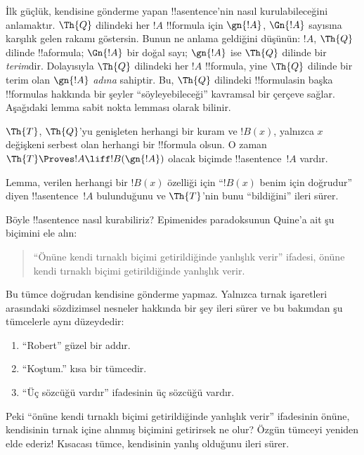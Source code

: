 İlk güçlük, kendisine gönderme yapan !!a{sentence}'nin nasıl kurulabileceğini
anlamaktır. $\Th{Q}$ dilindeki her $!A$ !!{formula} için $\gn{!A}$,
$\Gn{!A}$ sayısına karşılık gelen rakamı göstersin. Bunun ne anlama geldiğini
düşünün: $!A$, $\Th{Q}$ dilinde !!a{formula}; $\Gn{!A}$ bir doğal sayı;
$\gn{!A}$ ise $\Th{Q}$ dilinde bir \emph{terim}dir. Dolayısıyla $\Th{Q}$
dilindeki her $!A$ !!{formula}, yine $\Th{Q}$ dilinde bir terim olan
$\gn{!A}$ \emph{adına} sahiptir. Bu, $\Th{Q}$ dilindeki !!{formula}s{}in başka
!!{formula}s hakkında bir şeyler ``söyleyebileceği'' kavramsal bir çerçeve
sağlar. Aşağıdaki lemma sabit nokta lemması olarak bilinir.

\begin{lem}
$\Th{T}$, $\Th{Q}$'yu genişleten herhangi bir kuram ve $!B(x)$, yalnızca
$x$ değişkeni serbest olan herhangi bir !!{formula} olsun. O zaman
$\Th{T} \Proves !A \liff !B(\gn{!A})$ olacak biçimde !!a{sentence}~$!A$
vardır.
\end{lem}

Lemma, verilen herhangi bir $!B(x)$ özelliği için ``$!B(x)$ benim için
doğrudur'' diyen !!a{sentence}~$!A$ bulunduğunu ve $\Th{T}$'nin bunu
``bildiğini'' ileri sürer.

Böyle !!a{sentence} nasıl kurabiliriz? Epimenides paradoksunun Quine'a ait şu
biçimini ele alın:
\begin{quote}
``Önüne kendi tırnaklı biçimi getirildiğinde yanlışlık verir'' ifadesi,
önüne kendi tırnaklı biçimi getirildiğinde yanlışlık verir.
\end{quote}
Bu tümce doğrudan kendisine gönderme yapmaz. Yalnızca tırnak işaretleri
arasındaki sözdizimsel nesneler hakkında bir şey ileri sürer ve bu bakımdan
şu tümcelerle aynı düzeydedir:
\begin{enumerate}
\item ``Robert'' güzel bir addır.
\item ``Koştum.'' kısa bir tümcedir.
\item ``Üç sözcüğü vardır'' ifadesinin üç sözcüğü vardır.
\end{enumerate}
Peki ``önüne kendi tırnaklı biçimi getirildiğinde yanlışlık verir'' ifadesinin
önüne, kendisinin tırnak içine alınmış biçimini getirirsek ne olur? Özgün
tümceyi yeniden elde ederiz!{} Kısacası tümce, kendisinin yanlış olduğunu
ileri sürer.

